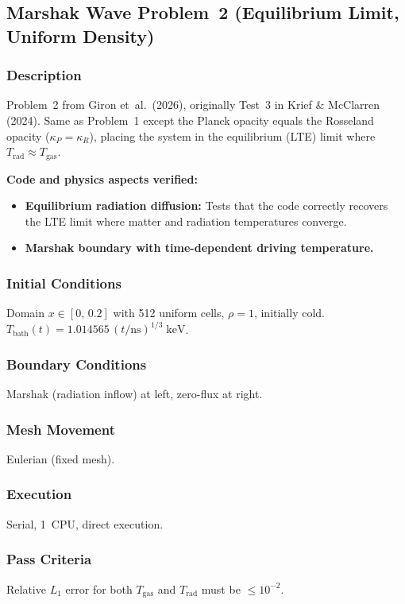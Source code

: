 \documentclass[11pt,a4paper]{article}
\begin{document}
\newpage

\subsection{Marshak Wave Problem~2 (Equilibrium Limit, Uniform Density)}
\label{sec:marshak_wave_2_diffusion}

\subsubsection*{Description}
Problem~2 from Giron et~al.\ (2026), originally Test~3 in Krief \& McClarren (2024). Same as Problem~1 except the Planck opacity equals the Rosseland opacity ($\kappa_P = \kappa_R$), placing the system in the equilibrium (LTE) limit where $T_{\mathrm{rad}} \approx T_{\mathrm{gas}}$.

\textbf{Code and physics aspects verified:}
\begin{itemize}
  \item \textbf{Equilibrium radiation diffusion:} Tests that the code correctly recovers the LTE limit where matter and radiation temperatures converge.
  \item \textbf{Marshak boundary with time-dependent driving temperature.}
\end{itemize}

\subsubsection*{Initial Conditions}
Domain $x \in [0,\,0.2]$ with 512 uniform cells, $\rho=1$, initially cold. $T_{\mathrm{bath}}(t) = 1.014565\,(t/\mathrm{ns})^{1/3}\;\mathrm{keV}$.

\subsubsection*{Boundary Conditions}
Marshak (radiation inflow) at left, zero-flux at right.

\subsubsection*{Mesh Movement}
Eulerian (fixed mesh).

\subsubsection*{Execution}
Serial, 1~CPU, direct execution.

\subsubsection*{Pass Criteria}
Relative $L_1$ error for both $T_{\mathrm{gas}}$ and $T_{\mathrm{rad}}$ must be $\le 10^{-2}$.
\end{document}
